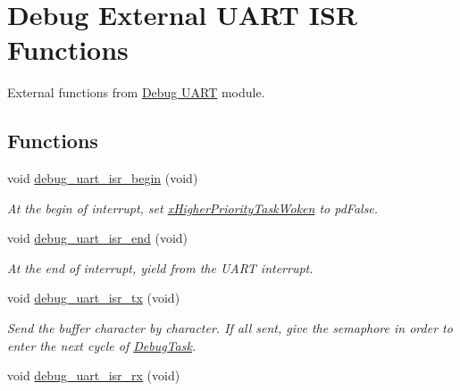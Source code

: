 \hypertarget{group___debug___external___functions}{}\section{Debug External U\+A\+RT I\+SR Functions}
\label{group___debug___external___functions}


External functions from \hyperlink{group___debug___uart}{Debug U\+A\+RT} module.  


\subsection*{Functions}
\begin{DoxyCompactItemize}
\item 
void \hyperlink{group___debug___external___functions_ga9d19c0e57b2d37c01bd781338322f682}{debug\+\_\+uart\+\_\+isr\+\_\+begin} (void)\hypertarget{group___debug___external___functions_ga9d19c0e57b2d37c01bd781338322f682}{}\label{group___debug___external___functions_ga9d19c0e57b2d37c01bd781338322f682}

\begin{DoxyCompactList}\small\item\em At the begin of interrupt, set \hyperlink{group___debug___private___variables_ga9d9a749ad99ec3d4a6886d5277b9ba87}{x\+Higher\+Priority\+Task\+Woken} to pd\+False. \end{DoxyCompactList}\item 
void \hyperlink{group___debug___external___functions_ga3f4c952ea2b6368ccbb0572addd76601}{debug\+\_\+uart\+\_\+isr\+\_\+end} (void)\hypertarget{group___debug___external___functions_ga3f4c952ea2b6368ccbb0572addd76601}{}\label{group___debug___external___functions_ga3f4c952ea2b6368ccbb0572addd76601}

\begin{DoxyCompactList}\small\item\em At the end of interrupt, yield from the U\+A\+RT interrupt. \end{DoxyCompactList}\item 
void \hyperlink{group___debug___external___functions_gaee765dd75f3414ade869071798ff33f4}{debug\+\_\+uart\+\_\+isr\+\_\+tx} (void)\hypertarget{group___debug___external___functions_gaee765dd75f3414ade869071798ff33f4}{}\label{group___debug___external___functions_gaee765dd75f3414ade869071798ff33f4}

\begin{DoxyCompactList}\small\item\em Send the buffer character by character. If all sent, give the semaphore in order to enter the next cycle of \hyperlink{group___debug___exported___functions___group2_ga0e7fca846e34e06a1f62249fe8a30a44}{Debug\+Task}. \end{DoxyCompactList}\item 
void \hyperlink{group___debug___external___functions_ga2e1878be0250daf30f0a286af6e683e9}{debug\+\_\+uart\+\_\+isr\+\_\+rx} (void)\hypertarget{group___debug___external___functions_ga2e1878be0250daf30f0a286af6e683e9}{}\label{group___debug___external___functions_ga2e1878be0250daf30f0a286af6e683e9}


\end{DoxyCompactItemize}
